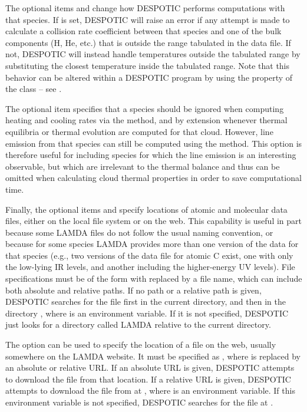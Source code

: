 \documentclass[letterpaper,10pt,english]{sphinxmanual}
\begin{document}
The optional items  and  change how DESPOTIC
performs computations with that species. If  is set,
DESPOTIC will raise an error if any attempt is made to calculate a
collision rate coefficient between that species and one of the bulk
components (H, He, etc.) that is outside the range tabulated in the
data file. If not, DESPOTIC will instead handle temperatures outside
the tabulated range by substituting the closest temperature inside the
tabulated range. Note that this behavior can be altered within a
DESPOTIC program by using the  property of the
 class -- see {\hyperref[fulldoc:sec\string-fulldoc]{}}.

The optional item  specifies that a species should be
ignored when computing heating and cooling rates via the
 method, and by extension whenever thermal equilibria or
thermal evolution are computed for that cloud. However, line emission
from that species can still be computed using the 
method. This option is therefore useful for including species for
which the line emission is an interesting observable, but which are
irrelevant to the thermal balance and thus can be omitted when
calculating cloud thermal properties in order to save computational
time.

Finally, the optional items  and  specify
locations of atomic and molecular data files, either on the local file
system or on the web. This capability is useful in part because some
LAMDA files do not follow the usual naming convention, or because for
some species LAMDA provides more than one version of the data for that
species (e.g., two versions of the data file for atomic C exist, one
with only the low-lying IR levels, and another including the
higher-energy UV levels). File specifications must be of the form
 with  replaced by a file name, which can include
both absolute and relative paths. If no path or a relative path is
given, DESPOTIC searches for the file first in the current directory,
and then in the directory , where
 is an environment variable. If it is not specified,
DESPOTIC just looks for a directory called LAMDA relative to the
current directory.

The  option can be used to specify the location of a file
on the web, usually somewhere on the LAMDA website. It must be
specified as , where  is replaced by an absolute or
relative URL. If an absolute URL is given, DESPOTIC attempts to
download the file from that location. If a relative URL is given,
DESPOTIC attempts to download the file from at
, where
 is an environment variable. If this environment
variable is not specified, DESPOTIC searches for the file at
.
\end{document}
